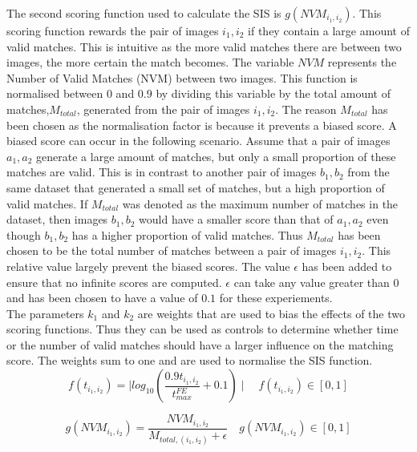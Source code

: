 \documentclass{report}
\begin{document}
The second scoring function used to calculate the SIS is $g(NVM_{i_1, i_2})$. This scoring function rewards the pair of images $i_1, i_2$ if they contain a large amount of valid matches. This is intuitive as the more valid matches there are between two images, the more certain the match becomes. The variable $NVM$ represents the Number of Valid Matches (NVM) between two images. This function is normalised between $0$ and  $0.9$ by dividing this variable by the total amount of matches,$M_{total}$, generated from the pair of images $i_1, i_2$. The reason $M_{total}$ has been chosen as the normalisation factor is because it prevents a biased score. A biased score can occur in the following scenario. Assume that a pair of images $a_1, a_2$ generate a large amount of matches, but only a small proportion of these matches are valid. This is in contrast to another pair of images $b_1, b_2$ from the same dataset that generated a small set of matches, but a high proportion of valid matches. If $M_{total}$ was denoted as the maximum number of matches in the dataset, then images $b_1, b_2$ would have a smaller score than that of $a_1, a_2$ even though $b_1, b_2$ has a higher proportion of valid matches. Thus $M_{total}$ has been chosen to be the total number of matches between a pair of images $i_1, i_2$. This relative value largely prevent the biased scores. The value $\epsilon$ has been added to ensure that no infinite scores are computed. $\epsilon$ can take any value greater than $0$ and has been chosen to have a value of $0.1$ for these experiements.\\ 

The parameters $k_1$ and $k_2$ are weights that are used to bias the effects of the two scoring functions. Thus they can be used as controls to determine whether time or the number of valid matches should have a larger influence on the matching score. The weights sum to one and are used to normalise the SIS function.\\

\begin{equation}
f(t_{i_1, i_2}) = \mid log_{10}(\frac{0.9 t_{i_1, i_2}}{t_{max}^{FE}} + 0.1) \mid \quad f(t_{i_1, i_2})\in [0, 1]
\label{eqn:time}
\end{equation}

\begin{equation}
g(NVM_{i_1, i_2}) = \frac{NVM_{i_1, i_2}}{M_{total, (i_1, i_2)} + \epsilon} \quad g(NVM_{i_1, i_2}) \in [0, 1] %
\label{eqn:nvm}
\end{equation}
\end{document}
